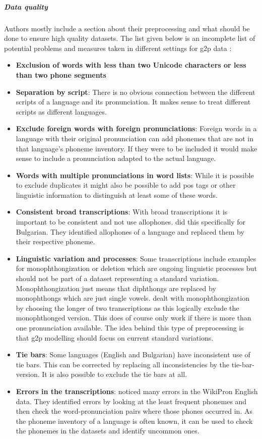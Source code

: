 \subparagraph{Data quality}
\label{data_qual}
Authors mostly include a section about their preprocessing and what should be done to ensure high quality datasets. The list given below is an incomplete list of potential problems and measures taken in different settings for \ac{g2p} data \citep{Ashby-Bartley.2021}:

\begin{itemize}
\item \textbf{Exclusion of words with less than two Unicode characters or less than two phone segments}  
\item \textbf{Separation by script}: There is no obvious connection between the different scripts of a language and its pronunciation. It makes sense to treat different scripts as different languages. 
\item \textbf{Exclude foreign words with foreign pronunciations}: Foreign words in a language with their original pronunciation can add phonemes that are not in that language's phoneme inventory. If they were to be included it would make sense to include a pronunciation adapted to the actual language.
\item \textbf{Words with multiple pronunciations in word lists}: While it is possible to exclude duplicates it might also be possible to add \ac{pos} tags or other linguistic information to distinguish at least some of these words.
\item \textbf{Consistent broad transcriptions}: With broad transcriptions it is important to be consistent and not use allophones. \cite{Ashby-Bartley.2021} did this specifically for Bulgarian. They identified allophones of a language and replaced them by their respective phoneme.
\item \textbf{Linguistic variation and processes}: Some transcriptions include examples for monophthongization or deletion which are ongoing linguistic processes but should not be part of a dataset representing a standard variation. Monophthongization just means that diphthongs are replaced by monophthongs which are just single vowels. \cite{Ashby-Bartley.2021} dealt with monophthongization by choosing the longer of two transcriptions as this logically exclude the monophthonged version. This does of course only work if there is more than one pronunciation available. The idea behind this type of preprocessing is that \ac{g2p} modelling should focus on current standard variations.
\item \textbf{Tie bars}: Some languages (English and Bulgarian) have inconsistent use of tie bars. This can be corrected by replacing all inconsistencies by the tie-bar-version. It is also possible to exclude the tie bars at all.
\item \textbf{Errors in the transcriptions}: \citet{gautam.2021} noticed many errors in the WikiPron English data. They identified errors by looking at the least frequent phonemes and then check the word-pronunciation pairs where those phones occurred in. As the phoneme inventory of a language is often known, it can be used to check the phonemes in the datasets and identify uncommon ones. 
\end{itemize}

